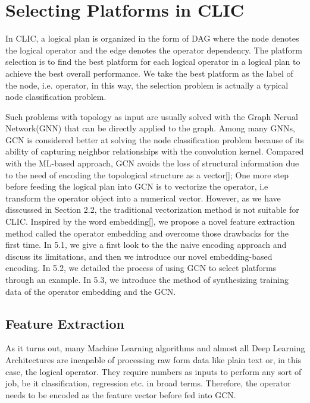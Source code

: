 
\section{Selecting Platforms in CLIC}


In CLIC, a logical plan is organized in the form of DAG where the node denotes the logical operator and the edge denotes the operator dependency.
The platform selection is to find the best platform for each logical operator in a logical plan to achieve the best overall performance.
We take the best platform as the label of the node, i.e. operator, in this way, the selection problem is actually a typical node classification problem.

Such problems with topology as input are usually solved with the Graph Nerual Network(GNN) that can be directly applied to the graph.
Among many GNNs, GCN is considered better at solving the node classification problem because of its ability of capturing neighbor relationships with the convolution kernel.
Compared with the ML-based approach, GCN avoids the loss of structural information due to the need of encoding the topological structure as a vector[];
One more step before feeding the logical plan into GCN is to vectorize the operator, i.e transform the operator object into a numerical vector.
However, as we have disscussed in Section 2.2, the traditional vectorization method is not suitable for CLIC. 
Inspired by the word embedding[], we propose a novel feature extraction method called the operator embedding and overcome those drawbacks for the first time.
In 5.1, we give a first look to the the naive encoding approach and discuss its limitations, and then we introduce our novel embedding-based encoding.
In 5.2, we detailed the process of using GCN to select platforms through an example.
In 5.3, we introduce the method of synthesizing training data of the operator embedding and the GCN.

\subsection{Feature Extraction}
As it turns out, many Machine Learning algorithms and almost all Deep Learning Architectures are incapable of processing raw form data like plain text or, in this case, the logical operator. 
They require numbers as inputs to perform any sort of job, be it classification, regression etc. in broad terms. 
Therefore, the operator needs to be encoded as the feature vector before fed into GCN.

